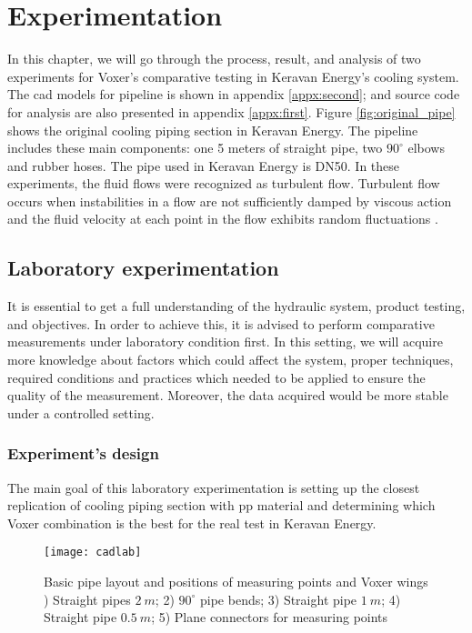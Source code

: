 
\chapter{Experimentation}

In this chapter, we will go through the process, result, and analysis of two experiments for Voxer's comparative testing in Keravan Energy's cooling system. The \gls{cad} models for pipeline is shown in appendix \ref{appx:second}; and source code for analysis are also presented in appendix \ref{appx:first}. Figure \vref{fig:original_pipe} shows the original cooling piping section in Keravan Energy. The pipeline includes these main components: one 5 meters of straight pipe, two $90^{\circ}$ elbows and rubber hoses. The pipe used in Keravan Energy is DN50. In these experiments, the fluid flows were recognized as turbulent flow. Turbulent flow occurs when instabilities in a flow are not sufficiently damped by viscous action and the fluid velocity at each point in the flow exhibits random fluctuations \cite{turbulent:article}.

\section{Laboratory experimentation}

It is essential to get a full understanding of the hydraulic system, product testing, and objectives. In order to achieve this, it is advised to perform comparative measurements under laboratory condition first. In this setting, we will acquire more knowledge about factors which could affect the system, proper techniques, required conditions and practices which needed to be applied to ensure the quality of the measurement. Moreover, the data acquired would be more stable under a controlled setting.

\subsection{Experiment's design}

The main goal of this laboratory experimentation is setting up the closest replication of cooling piping section with \gls{pp} material and determining which Voxer combination is the best for the real test in Keravan Energy. 
\begin{figure}[h]
  \centering
  \texttt{[image: cadlab]}
  \caption{ Basic pipe layout and positions of measuring points and Voxer wings ) Straight pipes $2\ m$; 2) $90^{\circ}$ pipe bends; 3) Straight pipe $1\ m$; 4) Straight pipe $0.5\ m$; 5) Plane connectors for measuring points}
  \label{fig:cadlab}
\end{figure}


